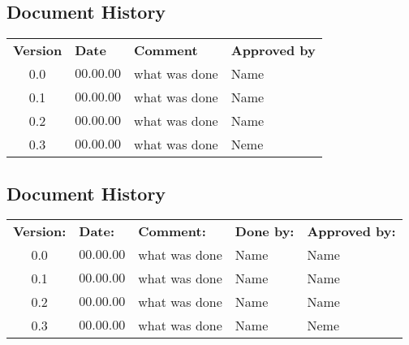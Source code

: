 \begin{center}
\section*{\textbf{Document History}}
\begin{tabular}{clll}

\rowcolor{cadetgrey}
\textbf{Version}    &\textbf{Date} 	 &\textbf{Comment}     &\textbf{Approved by}  \\

0.0       & $00.00.00$       & what was done    & Name          \\ \rowcolor{gainsboro}
0.1       & $00.00.00$       & what was done    & Name          \\
0.2       & $00.00.00$       & what was done    & Name          \\ \rowcolor{gainsboro}
0.3       & $00.00.00$       & what was done    & Neme          \\
\end{tabular}                                                                   
\end{center}


\begin{center}
\section*{\textbf{Document History}}
\begin{tabular}{cllll}
\rowcolor{cadetgrey}
\textbf{Version:}    &\textbf{Date:} 	 &\textbf{Comment:}    &\textbf{Done by:}   &\textbf{Approved by:}  \\

0.0       & $00.00.00$       & what was done  & Name    & Name          \\ \rowcolor{gainsboro}
0.1       & $00.00.00$       & what was done  & Name    & Name          \\
0.2       & $00.00.00$       & what was done  & Name    & Name          \\ \rowcolor{gainsboro}
0.3       & $00.00.00$       & what was done  & Name    & Neme          \\
\end{tabular}                                                                   
\end{center}


